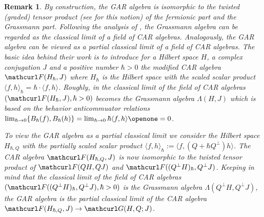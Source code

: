 \documentclass[pra,twoside,amsmath,amsfonts,amssymb,superscriptaddress,showpacs]{revtex4}
\newtheorem{rem}[thm]{Remark}
\def\9#1{{\mathcurl #1}}
\def\I{\openone}
\newcommand{\CAR}[2]{\9F(#1,#2)}
\newcommand{\SPROD}[2]{\langle{#1},{#2}\rangle}
\newcommand{\GR}[2]{\Lambda(#1,#2)}
\newcommand{\GAR}[3]{\9G(#1,#3;#2)}
\newcommand{\ACO}[2]{\{#1,#2\}}
\begin{document}
\begin{rem}\em
By construction, the GAR algebra is isomorphic to the twisted (graded) tensor product (see
\cite{ChoBruDeWitt82,ChoBruDeWitt89} for this notion) of the fermionic part and the Grassmann part.
Following the analysis of \cite{JadPil83}, the Grassmann algebra can be regarded as the classical
limit of a field of CAR algebras. Analogously, the GAR algebra can be viewed as a {\em partial}
classical limit of a field of CAR algebras. The basic idea behind their work is to introduce for a
Hilbert space $H$, a complex conjugation $J$ and a positive number $\hbar>0$ the modified CAR
algebra $\CAR{H_\hbar}{J}$ where $H_\hbar$ is the Hilbert space with the scaled scalar product
$\SPROD{f}{h}_\hbar=\hbar\cdot\SPROD{f}{h}$. Roughly, in the classical limit of the field of CAR
algebras $(\CAR{H_\hbar}{J},\hbar>0)$ becomes the Grassmann algebra $\GR{H}{J}$ which is based on
the behavior anticommuator relations $\lim_{\hbar\to 0}\ACO{B_\hbar (f)}{B_\hbar
(h)}=\lim_{\hbar\to 0}\hbar\SPROD{f}{h}\I =0$. 

To view the GAR algebra as a partial
classical limit we consider the Hilbert space $H_{\hbar,Q}$ with the partially scaled scalar product
$\SPROD{f}{h}_\hbar:=\SPROD{f}{(Q+\hbar Q^\perp)h}$. The CAR algebra $\CAR{H_{\hbar,Q}}{J}$ is now
isomorphic to the twisted tensor product of $\CAR{QH}{QJ}$ and $\CAR{(Q^\perp H)_\hbar}{Q^\perp J}$.
Keeping in mind that the classical limit of the field of CAR algebras $(\CAR{(Q^\perp
H)_\hbar}{Q^\perp J}, \hbar>0)$ is the Grassmann algebra $\GR{Q^\perp H}{Q^\perp J}$, the GAR
algebra is the partial classical limit of the CAR algebra $\CAR{H_{\hbar,
Q}}{J}\to\GAR{H}{J}{Q}$.
\end{rem}
\end{document}

